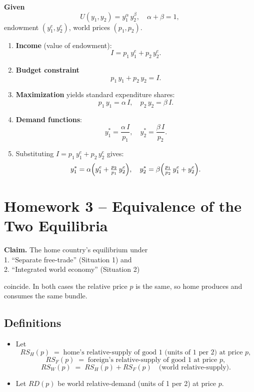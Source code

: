 \documentclass[
]{article}
\providecommand{\tightlist}{%
  \setlength{\itemsep}{0pt}\setlength{\parskip}{0pt}}
\begin{document}
\textbf{Given}\\
\[
U(y_{1},y_{2}) = y_{1}^{\alpha}\,y_{2}^{\beta},\quad \alpha + \beta = 1,
\] endowment \((y_{1}^{e},y_{2}^{e})\), world prices \((p_{1},p_{2})\).

\begin{enumerate}
\def\labelenumi{\arabic{enumi}.}
\tightlist
\item
  \textbf{Income} (value of endowment):\\
  \[
  I = p_{1}\,y_{1}^{e} + p_{2}\,y_{2}^{e}.
  \]
\item
  \textbf{Budget constraint}\\
  \[
  p_{1}\,y_{1} + p_{2}\,y_{2} = I.
  \]
\item
  \textbf{Maximization} yields standard expenditure shares:\\
  \[
  p_{1}\,y_{1} = \alpha\,I,
  \quad
  p_{2}\,y_{2} = \beta\,I.
  \]
\item
  \textbf{Demand functions}:\\
  \[
  \boxed{
    y_{1}^{*} = \frac{\alpha\,I}{p_{1}},
    \quad
    y_{2}^{*} = \frac{\beta\,I}{p_{2}}
  }.
  \]
\item
  Substituting \(I = p_{1}\,y_{1}^{e} + p_{2}\,y_{2}^{e}\) gives:\\
  \[
  y_{1}^{*}
  = \alpha\Bigl(y_{1}^{e} + \tfrac{p_{2}}{p_{1}}\,y_{2}^{e}\Bigr),
  \quad
  y_{2}^{*}
  = \beta\Bigl(\tfrac{p_{1}}{p_{2}}\,y_{1}^{e} + y_{2}^{e}\Bigr).
  \]
\end{enumerate}

\section{Homework 3 -- Equivalence of the Two
Equilibria}\label{homework-3-equivalence-of-the-two-equilibria}

\textbf{Claim.} The home country's equilibrium under\\
1. ``Separate free-trade'' (Situation 1) and\\
2. ``Integrated world economy'' (Situation 2)

coincide. In both cases the relative price \(p\) is the same, so home
produces and consumes the same bundle.

\subsection{Definitions}\label{definitions}

\begin{itemize}
\tightlist
\item
  Let\\
  \[
    RS_H(p) \;=\;\text{home’s relative‐supply of good 1 (units of 1 per 2) at price }p,
  \] \[
    RS_F(p) \;=\;\text{foreign’s relative‐supply of good 1 at price }p,
  \] \[
    RS_W(p)\;=\;RS_H(p)+RS_F(p)\quad\text{(world relative-supply).}
  \]
\item
  Let \(RD(p)\) be world relative-demand (units of 1 per 2) at price
  \(p\).
\end{itemize}
\end{document}
